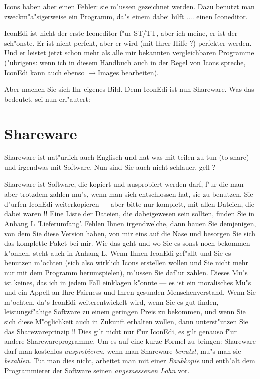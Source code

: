 Icons haben aber einen Fehler: sie m"ussen gezeichnet werden. 
Dazu benutzt man zweckm"a"sigerweise ein Programm, da"s einem 
dabei hilft .... einen Iconeditor. 

IconEdi ist nicht der erste Iconeditor f"ur ST/TT, aber ich 
meine, er ist der sch"onste. Er ist nicht perfekt, aber er 
wird (mit Ihrer Hilfe ?) perfekter werden. Und er leistet 
jetzt schon mehr als alle mir bekannten vergleichbaren 
Programme ("ubrigens: wenn ich in diesem Handbuch auch in
der Regel von Icons spreche, IconEdi kann auch ebenso 
$\to$Images  bearbeiten).

Aber machen Sie sich Ihr eigenes Bild. Denn IconEdi ist nun 
Shareware. Was das bedeutet, sei nun erl"autert:

\section{Shareware} 

Shareware ist nat"urlich auch Englisch und hat was mit teilen 
zu tun (to share) und irgendwas mit Software. Nun sind Sie 
auch nicht schlauer, gell ?

Shareware ist Software, die kopiert und ausprobiert werden darf, 
f"ur die man aber trotzdem zahlen mu"s, wenn man sich entschlossen 
hat, sie zu benutzen. Sie d"urfen IconEdi weiterkopieren --- aber 
bitte nur komplett, mit allen Dateien, die dabei waren !! Eine 
Liste der Dateien, die dabeigewesen sein sollten, finden Sie in 
Anhang L 'Lieferumfang'. Fehlen Ihnen irgendwelche, dann hauen 
Sie demjenigen, von dem Sie diese Version haben, von mir eins 
auf die Nase und besorgen Sie sich das komplette Paket bei mir. 
Wie das geht und wo Sie es sonst noch bekommen k"onnen, steht 
auch in Anhang L. Wenn Ihnen IconEdi gef"allt und Sie es benutzen 
m"ochten (sich also wirklich Icons erstellen wollen und Sie 
nicht mehr nur mit dem Programm herumspielen), m"ussen Sie daf"ur 
zahlen. Dieses Mu"s ist keines, das ich in jedem Fall 
einklagen k"onnte --- es 
ist ein moralisches Mu"s und ein Appell an Ihre Fairness und 
Ihren gesunden Menschenverstand. Wenn Sie m"ochten, da"s IconEdi 
weiterentwickelt wird, wenn Sie es gut finden, leistungsf"ahige 
Software zu einem geringen Preis zu bekommen, und wenn Sie sich 
diese M"oglichkeit auch in Zukunft erhalten wollen, dann 
unterst"utzen Sie das Sharewareprinzip !! Dies gilt nicht nur
f"ur IconEdi, es gilt genauso f"ur andere Sharewareprogramme. 
Um es auf eine kurze Formel zu bringen: Shareware darf man 
kostenlos {\sl ausprobieren}, wenn man Shareware {\sl benutzt}, 
mu"s man sie {\sl bezahlen}. Tut man dies nicht, arbeitet man
mit einer {\sl Raubkopie} und enth"alt dem Programmierer der 
Software seinen {\sl angemessenen Lohn} vor. 

